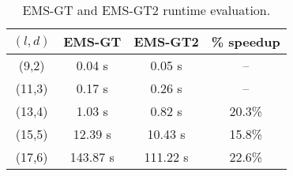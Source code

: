 \begin{table}[h] %
	\renewcommand{\arraystretch}{1.3}
	\caption{EMS-GT and EMS-GT2 runtime evaluation.}
	\label{tbl:final-results-ems}
	\centering
	\begin{tabular}{|c|c|c|c|}
	\hline 
	\bfseries\boldmath $(l,d)$ & 
	\bfseries EMS-GT & 
	\bfseries\boldmath EMS-GT2  & 
	\bfseries \% speedup\\
	\hline
	 (9,2) 	&   0.04 s &    0.05 s &     -- \\
	(11,3) &   0.17 s &    0.26 s &     -- \\
	(13,4) &   1.03 s &    0.82 s &   20.3\%\\
	(15,5) &  12.39 s &   10.43 s &   15.8\%\\
	(17,6) & 143.87 s &  111.22 s &   22.6\%\\
	\hline\end{tabular}
\end{table}
